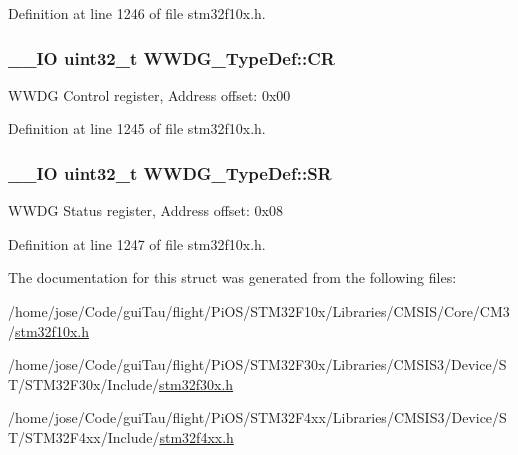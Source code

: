 Definition at line 1246 of file stm32f10x.\-h.

\hypertarget{struct_w_w_d_g___type_def_a4caf530d45f7428c9700d9c0057135f8}{
\subsubsection[{C\-R}]{\setlength{\rightskip}{0pt plus 5cm}\-\_\-\-\_\-\-I\-O {\bf uint32\-\_\-t} W\-W\-D\-G\-\_\-\-Type\-Def\-::\-C\-R}}\label{struct_w_w_d_g___type_def_a4caf530d45f7428c9700d9c0057135f8}
W\-W\-D\-G Control register, Address offset\-: 0x00 

Definition at line 1245 of file stm32f10x.\-h.

\hypertarget{struct_w_w_d_g___type_def_a15655cda4854cc794db1f27b3c0bba38}{
\subsubsection[{S\-R}]{\setlength{\rightskip}{0pt plus 5cm}\-\_\-\-\_\-\-I\-O {\bf uint32\-\_\-t} W\-W\-D\-G\-\_\-\-Type\-Def\-::\-S\-R}}\label{struct_w_w_d_g___type_def_a15655cda4854cc794db1f27b3c0bba38}
W\-W\-D\-G Status register, Address offset\-: 0x08 

Definition at line 1247 of file stm32f10x.\-h.



The documentation for this struct was generated from the following files\-:\begin{DoxyCompactItemize}
\item 
/home/jose/\-Code/gui\-Tau/flight/\-Pi\-O\-S/\-S\-T\-M32\-F10x/\-Libraries/\-C\-M\-S\-I\-S/\-Core/\-C\-M3/\hyperlink{stm32f10x_8h}{stm32f10x.\-h}\item 
/home/jose/\-Code/gui\-Tau/flight/\-Pi\-O\-S/\-S\-T\-M32\-F30x/\-Libraries/\-C\-M\-S\-I\-S3/\-Device/\-S\-T/\-S\-T\-M32\-F30x/\-Include/\hyperlink{stm32f30x_8h}{stm32f30x.\-h}\item 
/home/jose/\-Code/gui\-Tau/flight/\-Pi\-O\-S/\-S\-T\-M32\-F4xx/\-Libraries/\-C\-M\-S\-I\-S3/\-Device/\-S\-T/\-S\-T\-M32\-F4xx/\-Include/\hyperlink{stm32f4xx_8h}{stm32f4xx.\-h}\end{DoxyCompactItemize}
